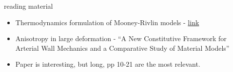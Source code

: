 \documentclass[
  letterpaper,
  ignorenonframetext,
  aspectratio=43,
  handout,
  12pt]{beamer}
\providecommand{\tightlist}{%
  \setlength{\itemsep}{0pt}\setlength{\parskip}{0pt}}
\providecommand{\tightlist}{%
\setlength{\itemsep}{0pt}\setlength{\parskip}{0pt}}
\begin{document}
\begin{frame}{reading material}
\protect\hypertarget{reading-material}{}
\begin{itemize}
\tightlist
\item
  Thermodynamics formulation of Mooney-Rivlin models -
  \href{http://continuummechanics.org/mooneyrivlin.html}{link}
\item
  Anisotropy in large deformation - ``A New Constitutive Framework for
  Arterial Wall Mechanics and a Comparative Study of Material Models''
\item
  Paper is interesting, but long, pp 10-21 are the most relevant.
\end{itemize}
\end{frame}
\end{document}
